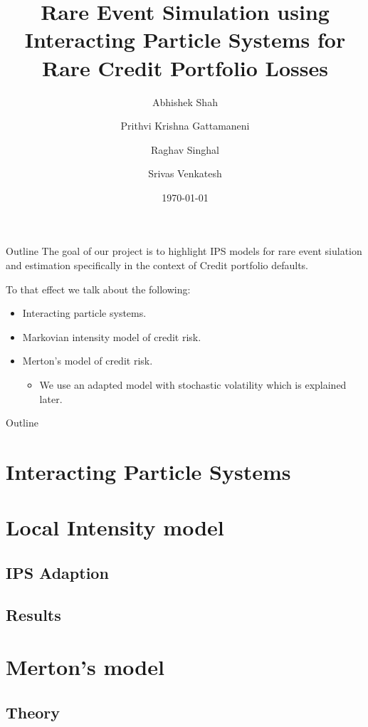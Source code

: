 \documentclass{beamer}
\title{Rare Event Simulation using Interacting Particle Systems for Rare Credit Portfolio Losses}
\author{
  Abhishek Shah \\
  \and
  Prithvi Krishna Gattamaneni\\
  \and
  Raghav Singhal\\
  \and
  Srivas Venkatesh \\
}
\institute[New York University] %
{
  Courant Institute of Mathematical Sciences\\
  New York University\\
}
\date{\today}
\begin{document}
\begin{frame}
	\titlepage
\end{frame}


\begin{frame}{Outline}
	The goal of our project is to highlight IPS models for rare event siulation
	and estimation specifically in the context of Credit portfolio defaults.
																
	To that effect we talk about the following:
	\begin{itemize}
		\item Interacting particle systems.
		\item Markovian intensity model of credit risk.
		\item Merton's model of credit risk.
		      \begin{itemize}
		      	\item We use an adapted model with stochastic volatility which
		      	      is explained later.
		      \end{itemize}
	\end{itemize}
\end{frame}

\begin{frame}{Outline}
	\tableofcontents
\end{frame}

\section{Interacting Particle Systems}
\section{Local Intensity model}
\subsection{IPS Adaption}

\subsection{Results}

\section{Merton's model}
\subsection{Theory}

\end{document}
